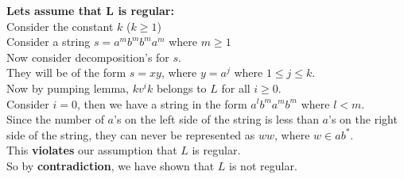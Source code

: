 \documentclass{article}
\begin{document}
\textbf{Lets assume that L is regular: }
\\
Consider the constant $k$ ($k \ge 1$)
\\
Consider a string $s = a^mb^mb^ma^m$ where $m \ge 1$ 
\\
Now consider decomposition's for $s$. 
\\
They will be of the form $s=xy$, where $y=a^j$ where $1 \le j \le k$. 
\\
Now by pumping lemma, $k v^i k$ belongs to $L$ for all $i \ge 0$. 
\\
Consider $i=0$, then we have a string in the form $a^l b^m a^m b^m$ where $l < m$. 
\\
Since the number of $a$'s on the left side of the string is less than $a$'s on the right side of the string, they can never be represented as $ww$, where $w \in ab^*$. 
\\  
This \textbf{violates} our assumption that $L$ is regular. 
\\
So by \textbf{contradiction}, we have shown that $L$ is not regular.
\end{document}
